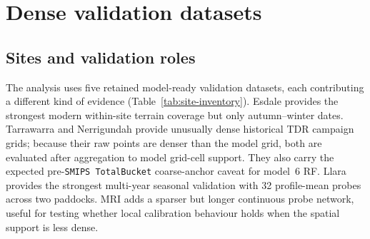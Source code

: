 \documentclass[11pt,a4paper]{article}
\newcommand{\modelSix}{model~6 RF}
\newcommand{\smips}{\texttt{SMIPS TotalBucket}}
\begin{document}
\section{Dense validation datasets}\label{sec:data}

\subsection{Sites and validation roles}\label{sec:sites}

The analysis uses five retained model-ready validation datasets, each
contributing a different kind of evidence (Table~\ref{tab:site-inventory}).
Esdale provides the strongest modern within-site terrain coverage but only
autumn--winter dates.  Tarrawarra and Nerrigundah provide unusually dense
historical TDR campaign grids; because their raw points are denser than the
model grid, both are evaluated after aggregation to model grid-cell support.
They also carry the expected pre-\smips{} coarse-anchor caveat for
\modelSix{}.  Llara provides the strongest multi-year seasonal validation with
32 profile-mean probes across two paddocks.  MRI adds a sparser but longer
continuous probe network, useful for testing whether local calibration
behaviour holds when the spatial support is less dense.
\end{document}
